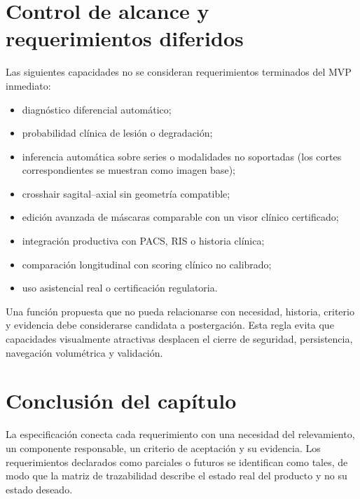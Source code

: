 \section{Control de alcance y requerimientos diferidos}

Las siguientes capacidades no se consideran requerimientos terminados del MVP inmediato:

\begin{itemize}
  \item diagnóstico diferencial automático;
  \item probabilidad clínica de lesión o degradación;
  \item inferencia automática sobre series o modalidades no soportadas (los cortes correspondientes se muestran como imagen base);
  \item crosshair sagital–axial sin geometría compatible;
  \item edición avanzada de máscaras comparable con un visor clínico certificado;
  \item integración productiva con PACS, RIS o historia clínica;
  \item comparación longitudinal con scoring clínico no calibrado;
  \item uso asistencial real o certificación regulatoria.
\end{itemize}

Una función propuesta que no pueda relacionarse con necesidad, historia, criterio y evidencia debe considerarse candidata a postergación. Esta regla evita que capacidades visualmente atractivas desplacen el cierre de seguridad, persistencia, navegación volumétrica y validación.

\section{Conclusión del capítulo}

La especificación conecta cada requerimiento con una necesidad del relevamiento, un componente responsable, un criterio de aceptación y su evidencia. Los requerimientos declarados como parciales o futuros se identifican como tales, de modo que la matriz de trazabilidad describe el estado real del producto y no su estado deseado.
